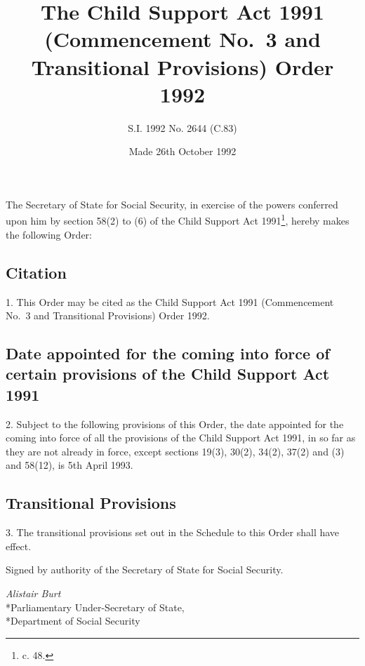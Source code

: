 \documentclass[a4paper]{article}
\title{The Child Support Act 1991 (Commencement No.\ 3 and Transitional Provisions) Order 1992}
\author{S.I. 1992 No. 2644 (C.83)}
\date{Made 26th October 1992}
\begin{document}
\maketitle

\noindent
The Secretary of State for Social Security, in exercise of the powers conferred upon him by section 58(2) to (6) of the Child Support Act 1991\footnote{ c. 48.}, hereby makes the following Order:

{\sloppy

\tableofcontents

}

\setcounter{secnumdepth}{-2}

\subsection[1. Citation]{Citation}

1.  This Order may be cited as the Child Support Act 1991 (Commencement No.\ 3 and Transitional Provisions) Order 1992.

\subsection[2. Date appointed for the coming into force of certain provisions of the Child Support Act 1991]{Date appointed for the coming into force of certain provisions of the Child Support Act 1991}

2.  Subject to the following provisions of this Order, the date appointed for the coming into force of all the provisions of the Child Support Act 1991, in so far as they are not already in force, except sections 19(3), 30(2), 34(2), 37(2) and (3) and 58(12), is 5th April 1993.

\subsection[3. Transitional Provisions]{Transitional Provisions}

3.  The transitional provisions set out in the Schedule to this Order shall have effect.

\bigskip

Signed by authority of the Secretary of State for Social Security.

{\raggedleft
\emph{Alistair Burt}\\*Parliamentary Under-Secretary of State,\\*Department of Social Security

}
\end{document}
